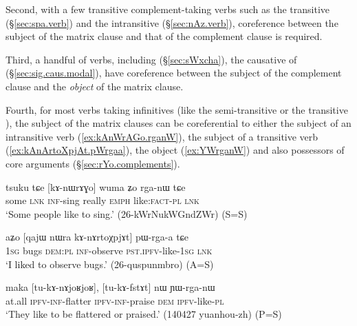 Second, with a few transitive com\-ple\-ment-taking verbs such as the transitive  (§\ref{sec:spa.verb}) and the intransitive  (§\ref{sec:nAz.verb}), coreference between the subject of the matrix clause and that of the complement clause is required. 

Third, a handful of verbs, including  (§\ref{sec:sWxcha}), the causative of  (§\ref{sec:sig.caus.modal}), have coreference between the subject of the complement clause and the \textit{object} of the matrix clause.

Fourth, for most verbs taking infinitives (like the semi-transitive  or the transitive ),  the subject of the matrix clauses can be coreferential to either the subject of an intransitive verb (\ref{ex:kAnWrAGo.rganW}), the subject of a transitive verb (\ref{ex:kAnArtoXpjAt.pWrgaa}), the object (\ref{ex:YWrganW}) and also possessors of core arguments (§\ref{sec:rYo.complements}).

\begin{exe}
   \ex   \label{ex:kAnWrAGo.rganW} 
\gll tsuku tɕe [kɤ-nɯrɤɣo] wuma ʑo rga-nɯ tɕe \\
some \textsc{lnk} \textsc{inf}-sing really \textsc{emph} like:\textsc{fact}-\textsc{pl}  \textsc{lnk} \\
\glt `Some people like to sing.' (26-kWrNukWGndZWr)  (S=S)
\end{exe}  
 
\begin{exe}
\ex   \label{ex:kAnArtoXpjAt.pWrgaa} 
\gll aʑo [qajɯ nɯra kɤ-nɤrtoχpjɤt] pɯ-rga-a tɕe  	\\
  	\textsc{1sg} bugs \textsc{dem}:\textsc{pl} \textsc{inf}-observe \textsc{pst}.\textsc{ipfv}-like-\textsc{1sg} \textsc{lnk}  \\
 \glt `I liked to observe bugs.' (26-quspunmbro) (A=S)
\end{exe}  
 
\begin{exe}
   \ex   \label{ex:YWrganW} 
\gll maka [tu-kɤ-nɤjoʁjoʁ], [tu-kɤ-fstɤt] nɯ ɲɯ-rga-nɯ  \\
at.all \textsc{ipfv}-\textsc{inf}-flatter \textsc{ipfv}-\textsc{inf}-praise \textsc{dem} \textsc{ipfv}-like-\textsc{pl} \\
\glt `They like to be flattered or praised.' (140427 yuanhou-zh) (P=S)
\end{exe}  


